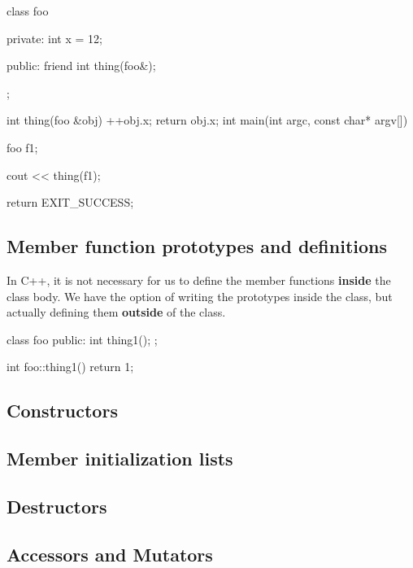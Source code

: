 \documentclass{report}
\begin{document}
    \begin{cppcode}
class foo {
private: 
    int x = 12;

public:
    friend int thing(foo&);
};

int thing(foo &obj) {
    ++obj.x;
    return obj.x;
}
int main(int argc, const char* argv[]) {

    foo f1;

    cout << thing(f1);
    
    return EXIT_SUCCESS;
}
    \end{cppcode}
    

    \bigbreak \noindent 
    \subsection{Member function prototypes and definitions}
    \bigbreak \noindent 
    In C++, it is not necessary for us to define the member functions \textbf{inside} the class body. We have the option of writing the prototypes inside the class, but actually defining them \textbf{outside} of the class.
    \bigbreak \noindent 
    
    \begin{cppcode}
class foo {
public:
    int thing1();
};

int foo::thing1() {
    return 1;
}
    \end{cppcode}
    
    \bigbreak \noindent 

    \pagebreak \bigbreak \noindent 
    \subsection{Constructors}
    \bigbreak \noindent 

    \bigbreak \noindent 
    \subsection{Member initialization lists}
    \bigbreak \noindent 

    \bigbreak \noindent 
    \subsection{Destructors}

    \bigbreak \noindent 
    \subsection{Accessors and Mutators}
    \bigbreak \noindent 
\end{document}
